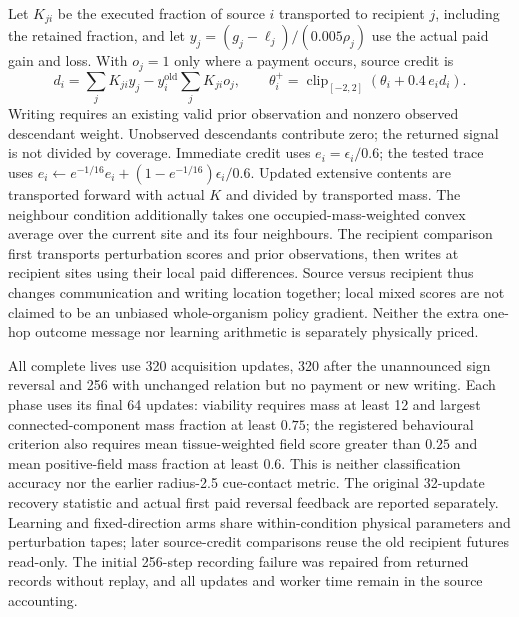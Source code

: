 Let $K_{ji}$ be the executed fraction of source $i$ transported to recipient $j$, including the retained fraction, and let $y_j=(g_j-\ell_j)/(0.005\rho_j)$ use the actual paid gain and loss. With $o_j=1$ only where a payment occurs, source credit is
\begin{equation}
 d_i=\sum_jK_{ji}y_j-y_i^{\mathrm{old}}\sum_jK_{ji}o_j,\qquad
 \theta_i^+=\operatorname{clip}_{[-2,2]}\left(\theta_i+0.4\,e_i d_i\right).
\end{equation}
Writing requires an existing valid prior observation and nonzero observed descendant weight. Unobserved descendants contribute zero; the returned signal is not divided by coverage. Immediate credit uses $e_i=\epsilon_i/0.6$; the tested trace uses $e_i\leftarrow e^{-1/16}e_i+(1-e^{-1/16})\epsilon_i/0.6$. Updated extensive contents are transported forward with actual $K$ and divided by transported mass. The neighbour condition additionally takes one occupied-mass-weighted convex average over the current site and its four neighbours. The recipient comparison first transports perturbation scores and prior observations, then writes at recipient sites using their local paid differences. Source versus recipient thus changes communication and writing location together; local mixed scores are not claimed to be an unbiased whole-organism policy gradient. Neither the extra one-hop outcome message nor learning arithmetic is separately physically priced.

All complete lives use 320 acquisition updates, 320 after the unannounced sign reversal and 256 with unchanged relation but no payment or new writing. Each phase uses its final 64 updates: viability requires mass at least 12 and largest connected-component mass fraction at least $0.75$; the registered behavioural criterion also requires mean tissue-weighted field score greater than $0.25$ and mean positive-field mass fraction at least $0.6$. This is neither classification accuracy nor the earlier radius-2.5 cue-contact metric. The original 32-update recovery statistic and actual first paid reversal feedback are reported separately. Learning and fixed-direction arms share within-condition physical parameters and perturbation tapes; later source-credit comparisons reuse the old recipient futures read-only. The initial 256-step recording failure was repaired from returned records without replay, and all updates and worker time remain in the source accounting.

